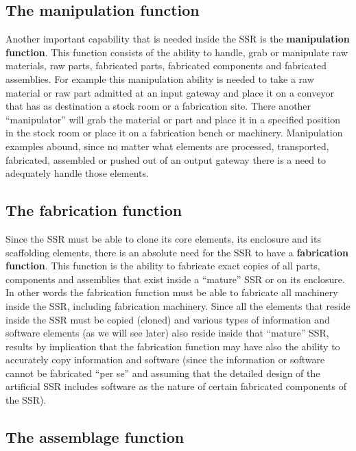 \subsection[The manipulation function]{The manipulation function}
\hypertarget{RefHeading3072306210128}{}Another important capability that
is needed inside the SSR is the \textbf{manipulation function}. This
function consists of the ability to handle, grab or manipulate raw
materials, raw parts, fabricated parts, fabricated components and
fabricated assemblies. For example this manipulation ability is needed
to take a raw material or raw part admitted at an input gateway and
place it on a conveyor that has as destination a stock room or a
fabrication site. There another “manipulator” will grab the material or
part and place it in a specified position in the stock room or place it
on a fabrication bench or machinery. Manipulation examples abound,
since no matter what elements are processed, transported, fabricated,
assembled or pushed out of an output gateway there is a need to
adequately handle those elements.

\subsection[The fabrication function]{The fabrication function}

\hypertarget{RefHeading3074306210128}{}Since the SSR must be able to
clone its core elements, its enclosure and its scaffolding elements,
there is an absolute need for the SSR to have a \textbf{fabrication
function}. This function is the ability to fabricate exact copies of
all parts, components and assemblies that exist inside a “mature” SSR
or on its enclosure. In other words the fabrication function must be
able to fabricate all machinery inside the SSR, including fabrication
machinery. Since all the elements that reside inside the SSR must be
copied (cloned) and various types of information and software elements
(as we will see later) also reside inside that “mature” SSR, results by
implication that the fabrication function may have also the ability to
accurately copy information and software (since the information or
software cannot be fabricated “per se” and assuming that the detailed
design of the artificial SSR includes software as the nature of certain
fabricated components of the SSR).

\subsection[The assemblage function]{The assemblage function}

